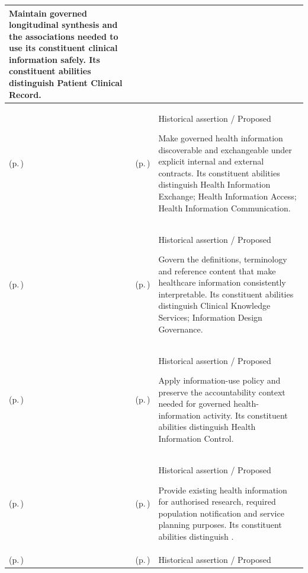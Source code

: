 \begin{longtable}{|>{\raggedright\arraybackslash}p{0.27\TableWidth}|>{\raggedright\arraybackslash}p{0.27\TableWidth}|>{\raggedright\arraybackslash}p{0.46\TableWidth}|}
Maintain governed longitudinal synthesis and the associations needed to use its constituent clinical information safely. Its constituent abilities distinguish Patient Clinical Record.\\\hline
\nameref{cap:bec-governed-health-information-enablement} (p.\,\pageref{cap:bec-governed-health-information-enablement}) & \nameref{cap:bec-health-information-connectivity-enablement} (p.\,\pageref{cap:bec-health-information-connectivity-enablement}) & Historical assertion / Proposed

Make governed health information discoverable and exchangeable under explicit internal and external contracts. Its constituent abilities distinguish Health Information Exchange; Health Information Access; Health Information Communication.\\\hline
\nameref{cap:bec-governed-health-information-enablement} (p.\,\pageref{cap:bec-governed-health-information-enablement}) & \nameref{cap:bec-semantic-reference-knowledge-enablement} (p.\,\pageref{cap:bec-semantic-reference-knowledge-enablement}) & Historical assertion / Proposed

Govern the definitions, terminology and reference content that make healthcare information consistently interpretable. Its constituent abilities distinguish Clinical Knowledge Services; Information Design Governance.\\\hline
\nameref{cap:bec-governed-health-information-enablement} (p.\,\pageref{cap:bec-governed-health-information-enablement}) & \nameref{cap:bec-information-protection-accountability-enablement} (p.\,\pageref{cap:bec-information-protection-accountability-enablement}) & Historical assertion / Proposed

Apply information-use policy and preserve the accountability context needed for governed health-information activity. Its constituent abilities distinguish Health Information Control.\\\hline
\nameref{cap:bec-governed-health-information-enablement} (p.\,\pageref{cap:bec-governed-health-information-enablement}) & \nameref{cap:bec-secondary-health-information-use-enablement} (p.\,\pageref{cap:bec-secondary-health-information-use-enablement}) & Historical assertion / Proposed

Provide existing health information for authorised research, required population notification and service planning purposes. Its constituent abilities distinguish .\\\hline
\nameref{cap:bec-human-collaboration-work-enablement} (p.\,\pageref{cap:bec-human-collaboration-work-enablement}) & \nameref{cap:bec-collaborative-interaction-enablement} (p.\,\pageref{cap:bec-collaborative-interaction-enablement}) & Historical assertion / Proposed


\end{longtable}
